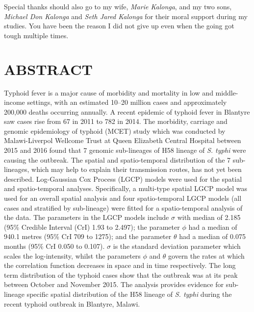 Special thanks should also go to my wife, \emph{Marie Kalonga}, and my two sons, \emph{Michael Don Kalonga} and \emph{Seth Jared Kalonga} for their moral support during my studies. You have been the reason I did not give up even when the going got tough multiple times.

\newpage

\cfoot{\thepage}
\setcounter{page}{6}


\chapter*{ABSTRACT}

Typhoid fever is a major cause of morbidity and mortality in low and middle-income settings, with an estimated 10–20 million cases and approximately 200,000 deaths occurring annually. A recent epidemic of typhoid fever in Blantyre saw cases rise from 67 in 2011 to 782 in 2014. The morbidity, carriage and genomic epidemiology of typhoid (MCET) study which was conducted by Malawi-Liverpol Wellcome Trust at Queen Elizabeth Central Hospital between 2015 and 2016 found that 7 genomic sub-lineages of H58 lineage of \textit{S. typhi} were causing the outbreak. The spatial and spatio-temporal distribution of the 7 sub-lineages, which may help to explain their transmission routes, has not yet been described. Log-Gaussian Cox Process (LGCP) models were used for the spatial and spatio-temporal analyses. Specifically, a multi-type spatial LGCP model was used for an overall spatial analysis and four spatio-temporal LGCP models (all cases and stratified by sub-lineage) were fitted for a spatio-temporal analysis of the data. The parameters in the LGCP models include $\sigma$ with median of 2.185 (95\% Credible Interval (CrI) 1.93 to 2.497); the parameter $\phi$ had a median of 940.1 metres (95\% CrI 709 to 1275); and the parameter $\theta$ had a median of 0.075 months (95\% CrI 0.050 to 0.107). $\sigma$ is the standard deviation parameter which scales the log-intensity, whilst the parameters $\phi$ and $\theta$ govern the rates at which the correlation function decreases in space and in time respectively. The long term distribution of the typhoid cases show that the outbreak was at its peak between October and November 2015. The analysis provides evidence for sub-lineage specific spatial distribution of the H58 lineage of \textit{S. typhi} during the recent typhoid outbreak in Blantyre, Malawi.

\restoregeometry

\newpage